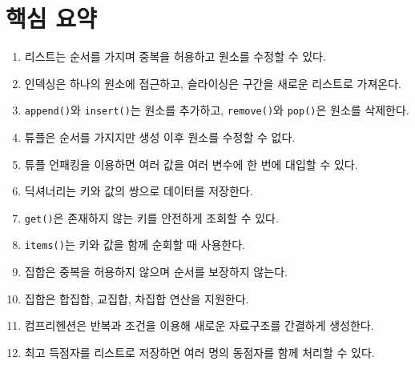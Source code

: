 \documentclass[11pt,a4paper]{article}
\begin{document}
\section{핵심 요약}

\begin{enumerate}
    \item 리스트는 순서를 가지며 중복을 허용하고 원소를 수정할 수 있다.
    \item 인덱싱은 하나의 원소에 접근하고, 슬라이싱은 구간을 새로운 리스트로 가져온다.
    \item \texttt{append()}와 \texttt{insert()}는 원소를 추가하고, \texttt{remove()}와 \texttt{pop()}은 원소를 삭제한다.
    \item 튜플은 순서를 가지지만 생성 이후 원소를 수정할 수 없다.
    \item 튜플 언패킹을 이용하면 여러 값을 여러 변수에 한 번에 대입할 수 있다.
    \item 딕셔너리는 키와 값의 쌍으로 데이터를 저장한다.
    \item \texttt{get()}은 존재하지 않는 키를 안전하게 조회할 수 있다.
    \item \texttt{items()}는 키와 값을 함께 순회할 때 사용한다.
    \item 집합은 중복을 허용하지 않으며 순서를 보장하지 않는다.
    \item 집합은 합집합, 교집합, 차집합 연산을 지원한다.
    \item 컴프리헨션은 반복과 조건을 이용해 새로운 자료구조를 간결하게 생성한다.
    \item 최고 득점자를 리스트로 저장하면 여러 명의 동점자를 함께 처리할 수 있다.
\end{enumerate}
\end{document}
